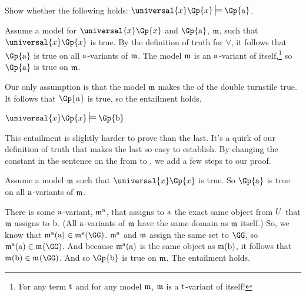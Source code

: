 \begin{majorILnc}{}
	Show whether the following holds: $\universal{\variable{x}}\Gp{\variable{x}}\sdtstile{}{}\Gp{\constant{a}}$.
\end{majorILnc}
\begin{PROOF}
	Assume a model for $\universal{\variable{x}}\Gp{\variable{x}}$ and $\Gp{\constant{a}}$, $\mathfrak{m}$, such that $\universal{\variable{x}}\Gp{\variable{x}}$ is true.
	By the definition of truth for $\forall$, it follows that $\Gp{\constant{a}}$ is true on all $\mathrm{a}$-variants of $\mathfrak{m}$.  The model $\mathfrak{m}$ is an $\mathrm{a}$-variant of itself,\footnote{For any term $\mathrm{t}$ and for any model $\mathfrak{m}$, $\mathfrak{m}$ is a $\mathrm{t}$-variant of itself!} so $\Gp{\constant{a}}$ is true on $\mathfrak{m}$.
	
	Our only assumption is that the model $\mathfrak{m}$ makes the  of the double turnstile true.  It follows that $\Gp{\constant{a}}$ is true, so the entailment holds.
\end{PROOF}
\begin{majorILnc}{}
	$\universal{\variable{x}}\Gp{\variable{x}}\sdtstile{}{}\Gp{\constant{b}}$
\end{majorILnc}
\begin{PROOF}
	This entailment is slightly harder to prove than the last.  It's a quirk of our definition of truth that makes the last so easy to establish.  By changing the constant in the sentence on the  from  to , we add a few steps to our proof.
	
	Assume a model $\mathfrak{m}$ such that $\universal{\variable{x}}\Gp{\variable{x}}$ is true.
	So $\Gp{\constant{a}}$ is true on all $\mathrm{a}$-variants of $\mathfrak{m}$.  
	
	There is some $\mathrm{a}$-variant, $\mathfrak{m^{\mathrm{\mathrm{a}}}_{\mathrm{}}}$, that assigns to $\mathrm{a}$ the exact same object from $U$ that $\mathfrak{m}$ assigns to $\mathrm{b}$.  (All $\mathrm{a}$-variants of $\mathfrak{m}$ have the same domain as $\mathfrak{m}$ itself.)  So, we know that $\As{\constant{a}}{}(\constant{a})\in\As{\constant{a}}{}(\GG)$.  $\mathfrak{m^{\mathrm{\mathrm{a}}}_{\mathrm{}}}$ and $\mathfrak{m}$ assign the same set to $\GG$, so $\As{\constant{a}}{}(\constant{a})\in\As{}{}(\GG)$.  And because $\mathfrak{m^{\mathrm{\mathrm{a}}}_{\mathrm{}}}(\mathrm{a})$ is the same object as $\mathfrak{m}(\mathrm{b})$, it follows that $\As{}{}(\constant{b})\in\As{}{}(\GG)$.  And so $\Gp{\constant{b}}$ is true on $\mathfrak{m}$.  The entailment holds.
\end{PROOF}

